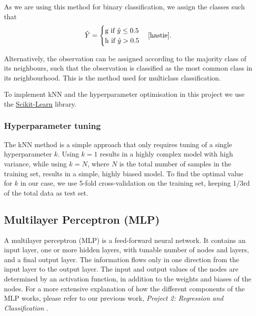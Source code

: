 \documentclass[a4paper, 11pt, twocolumn]{article}
\begin{document}
As we are using this method for binary classification, we assign the classes such 
that 
\begin{equation}
\hat{Y}=
\begin{cases}
      \text{g if }  \hat{y}\leq 0.5\\
      \text{h if } \hat{y} > 0.5
\end{cases} \cite{hastie}. 
\end{equation} 

Alternatively, the observation can be assigned according to the majority class of 
its neighbours, such that the observation is classified as the most common class 
in its neighbourhood. This is the method used for multiclass classification.

To implement kNN and the hyperparameter optimisation in this project we use the 
\href{https://scikit-learn.org/stable}{Scikit-Learn} 
library. 

\subsubsection{Hyperparameter tuning}
The kNN method is a simple approach that only requires tuning of a single 
hyperparameter $k$. Using $k=1$ results in a highly complex model with high 
variance, while using $k=N$, where $N$ is the total number of samples in the 
training set, results in a simple, highly biased model. To find the optimal value 
for $k$ in our case, we use 5-fold cross-validation on the training set, keeping 
1/3rd of the total data as test set. 


\subsection{Multilayer Perceptron (MLP)}
A multilayer perceptron (MLP) is a feed-forward neural network. It contains an 
input layer, one or more hidden layers, with tunable number of nodes and layers, 
and a final output layer. The information flows only in one direction from the 
input layer to the output layer. The input and output values of the nodes are 
determined by an activation function, in addition to the weights and biases of 
the nodes. For a more extensive explanation of how the different components of 
the MLP works, please refer to our previous work, \textit{Project 2: Regression 
and Classification} \cite{project2}.
\end{document}
